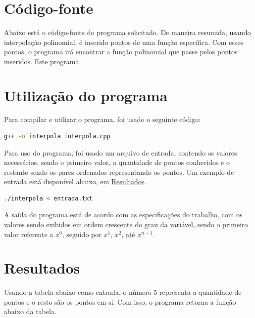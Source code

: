 \documentclass{article}
\begin{document}
\section{Código-fonte}
\label{sec:codigofonte1}
\paragraph{} Abaixo está o código-fonte do programa solicitado. De maneira resumida, usando interpolação polinomial, é inserido pontos de uma função específica. Com esses pontos, o programa irá encontrar a função polinomial que passe pelos pontos inseridos. Este programa 


\section{Utilização do programa}
\paragraph{} Para compilar e utilizar o programa, foi usado o seguinte código:

\begin{lstlisting}[language=bash]
    g++ -o interpola interpola.cpp
\end{lstlisting}

Para uso do programa, foi usado um arquivo de entrada, contendo os valores necessários, sendo o primeiro valor, a quantidade de pontos conhecidos e o restante sendo os pares ordenados representando os pontos. Um exemplo de entrada está disponível abaixo, em \hyperref[sec:resultados]{Resultados}.

\begin{lstlisting}[language=bash]
    ./interpola < entrada.txt
\end{lstlisting}

A saída do programa está de acordo com as especificações do trabalho, com os valores sendo exibidos em ordem crescente do grau da variável, sendo o primeiro valor referente a \( x^0 \), seguido por \( x^1 \), \( x^2 \), até \( x^{n-1} \).

\section{Resultados}
\label{sec:resultados}
\paragraph{} Usando a tabela abaixo como entrada, o número 5 representa a quantidade de pontos e o resto são os pontos em si. Com isso, o programa retorna a função abaixo da tabela.
\end{document}
